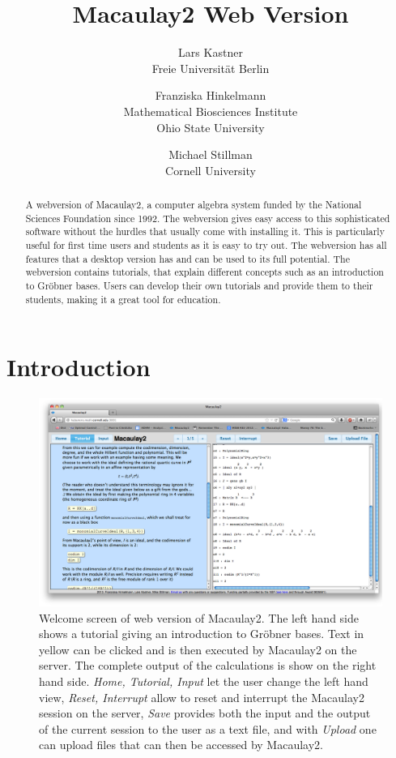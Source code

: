 \documentclass[]{article}
\title{Macaulay2 Web Version}
\author{Lars Kastner\\ Freie Universit\"at Berlin \and 
Franziska Hinkelmann\\Mathematical Biosciences Institute\\ Ohio State University \and 
Michael Stillman\\Cornell University  }
\date{}
\begin{document}
\ifpdf
{}
\else
{}
\fi

\maketitle


\begin{abstract}
    A webversion of Macaulay2, a computer algebra system funded by the National Sciences Foundation since 1992. The webversion gives easy access to this sophisticated software without the hurdles that usually come with installing it. This is particularly useful for first time users and students as it is easy to try out. The webversion has all features that a desktop version has and can be used to its full potential. The webversion contains tutorials, that explain different concepts such as an introduction to Gr\"obner bases. Users can develop their own tutorials and provide them to their students, making it a great tool for education. 
\end{abstract}

\section{Introduction}
\begin{figure}[htb]
    \includegraphics[width=.95\textwidth]{homeWebsite.jpg}
    \caption{Welcome screen of web version of Macaulay2. The left hand side shows a tutorial giving an introduction to Gr\"obner bases. Text in yellow can be clicked and is then executed by Macaulay2 on the server. The complete output of the calculations is show on the right hand side. {\it Home, Tutorial, Input} let the user change the left hand view, {\it Reset, Interrupt} allow to reset and interrupt the Macaulay2 session on the server, {\it Save}  provides both the input and the output of the current session to the user as a text file, and with {\it Upload} one can upload files that can then be accessed by Macaulay2.}
    \label{fig:home}
\end{figure}
\end{document}
